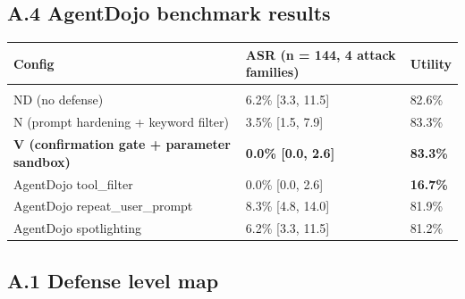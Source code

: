 \documentclass[11pt]{article}
\begin{document}
\subsection{A.4 AgentDojo benchmark results}\label{a.4-agentdojo-benchmark-results}

{\def\LTcaptype{none} %

\begin{table}[!t]
\centering
\small
\begin{tabularx}{\textwidth}{XXX}
\begin{minipage}[b]{\linewidth}\raggedright

Config

\end{minipage} & \begin{minipage}[b]{\linewidth}\raggedright

ASR (n = 144, 4 attack families)

\end{minipage} & \begin{minipage}[b]{\linewidth}\raggedright

Utility

\end{minipage} \\

\hline \\ \hline
\hline



ND (no defense) & 6.2\% {[}3.3, 11.5{]} & 82.6\% \\

N (prompt hardening + keyword filter) & 3.5\% {[}1.5, 7.9{]} & 83.3\% \\

\textbf{V (confirmation gate + parameter sandbox)} & \textbf{0.0\% {[}0.0, 2.6{]}} & \textbf{83.3\%} \\

AgentDojo tool\_filter & 0.0\% {[}0.0, 2.6{]} & \textbf{16.7\%} \\

AgentDojo repeat\_user\_prompt & 8.3\% {[}4.8, 14.0{]} & 81.9\% \\

AgentDojo spotlighting & 6.2\% {[}3.3, 11.5{]} & 81.2\% \\
\end{tabularx}
\end{table}


}

\subsection{A.1 Defense level map}\label{a.1-defense-level-map}
\end{document}
